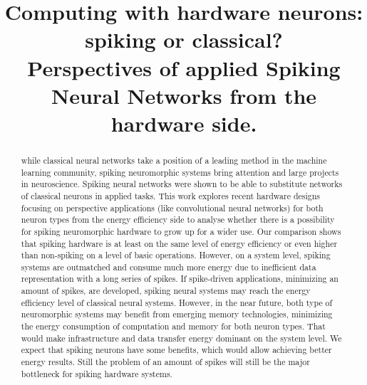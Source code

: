 \documentclass[conference, compsoc]{IEEEtran}
\begin{document}
\title{Computing with hardware neurons: spiking or classical?\\
	Perspectives of applied Spiking Neural Networks from the hardware side.}

\author{
\and
{}
}

\maketitle


\begin{abstract}
while classical neural networks take a position of a leading method in the machine learning community, spiking neuromorphic systems bring attention and large projects in neuroscience. Spiking neural networks were shown to be able to substitute networks of classical neurons in applied tasks. This work explores recent hardware designs focusing on perspective applications (like convolutional neural networks) for both neuron types from the energy efficiency side to analyse whether there is a possibility for spiking neuromorphic hardware to grow up for a wider use. Our comparison shows that spiking hardware is at least on the same level of energy efficiency or even higher than non-spiking on a level of basic operations. However, on a system level, spiking systems are outmatched and consume much more energy due to inefficient data representation with a long series of spikes. If spike-driven applications, minimizing an amount of spikes, are developed, spiking neural systems may reach the energy efficiency level of classical neural systems. However, in the near future, both type of neuromorphic systems may benefit from emerging memory technologies, minimizing the energy consumption of computation and memory for both neuron types. That would make infrastructure and data transfer energy dominant on the system level. We expect that spiking neurons have some benefits, which would allow achieving better energy results. Still the problem of an amount of spikes will still be the major bottleneck for spiking hardware systems.
\end{abstract}

\IEEEpeerreviewmaketitle
\end{document}
